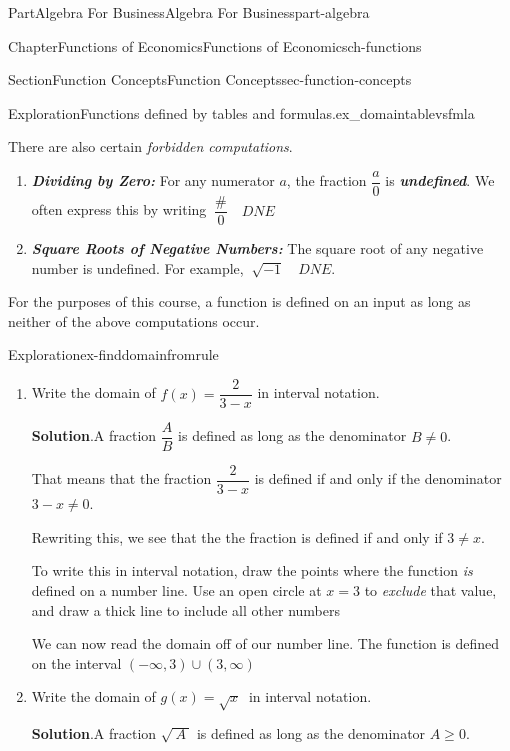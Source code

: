\documentclass[oneside,10pt,]{tufte-book}
\newcommand{\blocktitlefont}{\relax}
\newcommand{\alert}[1]{\textbf{\textit{#1}}}
\numberwithin{equation}{chapter}
\begin{document}
\begin{partptx}{Part}{Algebra For Business}{}{Algebra For Business}{}{}{part-algebra}
\begin{chapterptx}{Chapter}{Functions of Economics}{}{Functions of Economics}{}{}{ch-functions}
\begin{sectionptx}{Section}{Function Concepts}{}{Function Concepts}{}{}{sec-function-concepts}
\begin{exploration}{Exploration}{Functions defined by tables and formulas.}{ex_domaintablevsfmla}
\end{exploration}%
There are also certain \emph{forbidden computations}.%
\begin{enumerate}
\item{}\alert{Dividing by Zero:} For any numerator \(a\), the fraction \(\dfrac{a}{0}\) is \alert{undefined}.  We often express this by writing \(\ \dfrac{\#}{0} \quad DNE\)%
\item{}\alert{Square Roots of Negative Numbers:} The square root of any negative number is undefined. For example, \(\ \sqrt{-1}\quad DNE\).%
\end{enumerate}
For the purposes of this course, a function is defined on an input as long as neither of the above computations occur.%
\begin{exploration}{Exploration}{}{ex-finddomainfromrule}%
\begin{enumerate}[font=\bfseries,label=(\alph*),ref=\alph*]%
\item{}Write the domain of \(f(x) = \dfrac{2}{3-x}\) in interval notation.%
\par\smallskip%
\noindent\textbf{\blocktitlefont Solution}.\hypertarget{ex-finddomainfromrule-1-2}{}\quad{}A fraction \(\dfrac{A}{B}\) is defined as long as the denominator \(B\neq 0\).%
\par
That means that the fraction \(\dfrac{2}{3-x}\) is defined if and only if the denominator \(3-x \neq 0\).%
\par
Rewriting this, we see that the the fraction is defined if and only if \(3 \neq x\).%
\par
To write this in interval notation, draw the points where the function \emph{is} defined on a number line. Use an open circle at \(x=3\) to \emph{exclude} that value, and draw a thick line to include all other numbers%
\begin{image}{0.25}{0.5}{0.25}{}%
%
\end{image}%
We can now read the domain off of our number line. The function is defined on the interval \((-\infty,3)\cup(3,\infty)\)%
\item{}Write the domain of \(g(x) = \sqrt{x}\ \) in interval notation.%
\par\smallskip%
\noindent\textbf{\blocktitlefont Solution}.\hypertarget{ex-finddomainfromrule-2-2}{}\quad{}A fraction \(\sqrt{\ A\ }\) is defined as long as the denominator \(A\geq 0\).%

\end{enumerate}
\end{exploration}
\end{sectionptx}
\end{chapterptx}
\end{partptx}
\end{document}
